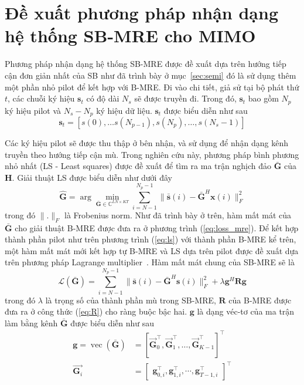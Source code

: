 \section{Đề xuất phương pháp nhận dạng hệ thống SB-MRE cho MIMO}

Phương pháp nhận dạng hệ thống SB-MRE được đề xuất dựa trên hướng tiếp cận đơn giản nhất của SB như đã trình bày ở mục~\ref{sec:semi} đó là sử dụng thêm một phần nhỏ pilot để kết hợp với B-MRE. Đi vào chi tiết, giả sử tại bộ phát thứ $t$, các chuỗi ký hiệu $\mathbf{s}_t$ có độ dài $N_s$ sẽ được truyền đi. Trong đó, $\mathbf{s}_t$ bao gồm $N_p$ ký hiệu pilot và $N_s - N_p$ ký hiệu dữ liệu. $\mathbf{s}_t$ được biểu diễn như sau
\begin{equation}
\mathbf{s}_t = \left[s(0), \ldots s\left(N_{p-1}\right), s\left(N_p\right), \ldots, s\left(N_s-1\right)\right]
\end{equation}

Các ký hiệu pilot sẽ được thu thập ở bên nhận, và sử dụng để nhận dạng kênh truyền theo hướng tiếp cận mù. Trong nghiên cứu này, phương pháp bình phương nhỏ nhất (LS - Least squares) được đề xuất để tìm ra ma trận nghịch đảo $\bar{\mathbf{G}}$ của $\mathbf{H}$. Giải thuật LS được biểu diễn như dưới đây
\begin{equation}
\label{eq:ls}
    \hat{\mathbf{G}} = \arg \underset{\bar{\mathbf{G}} \in \mathbb{C}^{LN \times KT}}{\min} \sum_{i=N-1}^{N_{p} - 1}\|\bar{\mathbf{s}}(i)- \bar{\mathbf{G}}^H \mathbf{x}(i)\|_F^2 
\end{equation}
trong đó $\lVert . \rVert _F$ là Frobenius norm. Như đã trình bày ở trên, hàm mất mát của $\bar{\mathbf{G}}$ cho giải thuật B-MRE được đưa ra ở phương trình (\ref{eq:loss_mre}). Để kết hợp thành phần pilot như trên phương trình (\ref{eq:ls}) với thành phần B-MRE kể trên, một hàm mất mát mới kết hợp tự B-MRE và LS dựa trên pilot được đề xuất dựa trên phương pháp Lagrange multiplier~\cite{bertsekas2014constrained}. Hàm mất mát chung của SB-MRE sẽ là
\begin{equation}
\label{eq:cost}
    \mathcal{L}(\bar{\mathbf{G}})=\sum_{i=N-1}^{N_{p} - 1}\|\bar{\mathbf{s}}(i)- \bar{\mathbf{G}}^H \mathbf{s}(i)\|_F^2 +\lambda \mathbf{g}^H \mathbf{R} \mathbf{g}
\end{equation}
trong đó $\lambda$ là trọng số của thành phần mù trong SB-MRE, $\mathbf{R}$ của B-MRE được đưa ra ở công thức (\ref{eq:R}) cho ràng buộc bậc hai. $\mathbf{g}$ là dạng véc-tơ của ma trận làm bằng kênh $\bar{\mathbf{G}}$ được biểu diễn như sau
\begin{equation}
\label{eq:vecG}
    \begin{aligned}
        \mathbf{g} = \operatorname{vec}(\bar{\mathbf{G}}) &=\left[\vec{\mathbf{G}}_0^\top, \vec{\mathbf{G}}_1^\top, \ldots, \vec{\mathbf{G}}_{K-1}^\top\right]^\top \\
        \vec{\mathbf{G}_i} &= \left[\begin{array}{ll}
        \mathbf{g}_{0, i}^\top, \mathbf{g}_{1, i}^\top, \cdots, \mathbf{g}_{T-1, i}^\top
        \end{array}\right]^\top
    \end{aligned}
\end{equation}

